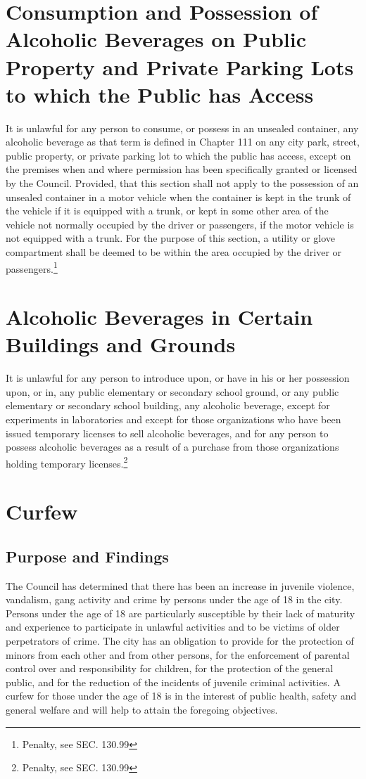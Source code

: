 \section{Consumption and Possession of Alcoholic Beverages on Public Property and Private Parking Lots to which the Public has Access}
It is unlawful for any person to consume, or possess in an unsealed container, any alcoholic beverage as that term is defined in Chapter 111 on any city park, street, public property, or private parking lot to which the public has access, except on the premises when and where permission has been specifically granted or licensed by the Council.  Provided, that this section shall not apply to the possession of an unsealed container in a motor vehicle when the container is kept in the trunk of the vehicle if it is equipped with a trunk, or kept in some other area of the vehicle not normally occupied by the driver or passengers, if the motor vehicle is not equipped with a trunk.  For the purpose of this section, a utility or glove compartment shall be deemed to be within the area occupied by the driver or passengers.\footnote{Penalty, see SEC. 130.99}

\section{Alcoholic Beverages in Certain Buildings and Grounds}
It is unlawful for any person to introduce upon, or have in his or her possession upon, or in, any public elementary or secondary school ground, or any public elementary or secondary school building, any alcoholic beverage, except for experiments in laboratories and except for those organizations who have been issued temporary licenses to sell alcoholic beverages, and for any person to possess alcoholic beverages as a result of a purchase from those organizations holding temporary licenses.\footnote{Penalty, see SEC. 130.99}

\section{Curfew}
\subsection{Purpose and Findings}
The Council has determined that there has been an increase in juvenile violence, vandalism, gang activity and crime by persons under the age of 18 in the city.  Persons under the age of 18 are particularly susceptible by their lack of maturity and experience to participate in unlawful activities and to be victims of older perpetrators of crime.  The city has an obligation to provide for the protection of minors from each other and from other persons, for the enforcement of parental control over and responsibility for children, for the protection of the general public, and for the reduction of the incidents of juvenile criminal activities.  A curfew for those under the age of 18 is in the interest of public health, safety and general welfare and will help to attain the foregoing objectives.
